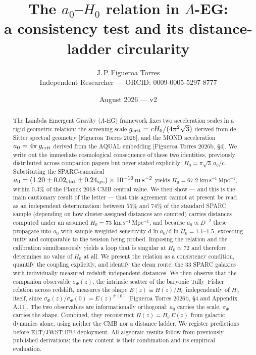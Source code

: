 \documentclass[11pt,a4paper]{article}
\title{The $a_0$--$H_0$ relation in $\Lambda$-EG:\\
a consistency test and its distance-ladder circularity}
\author{J.\,P.\,Figueroa Torres\\
\small Independent Researcher --- ORCID: 0009-0005-5297-8777}
\date{August 2026 --- v2}
\begin{document}
\maketitle

\begin{abstract}
The Lambda Emergent Gravity ($\Lambda$-EG) framework fixes two acceleration
scales in a rigid geometric relation: the screening scale $g_{\rm crit} =
cH_0/(4\pi^2\sqrt{3})$ derived from de Sitter spectral geometry [Figueroa
Torres 2026], and the MOND acceleration $a_0 = 4\pi\, g_{\rm crit}$ derived from
the AQUAL embedding [Figueroa Torres 2026b, \S4]. We write out the immediate
cosmological consequence of these two identities, previously distributed
across companion papers but never stated explicitly: $H_0 = \pi\sqrt{3}\,
a_0/c$. Substituting the SPARC-canonical $a_0 = (1.20 \pm 0.02_{\rm stat}
\pm 0.24_{\rm sys})\times 10^{-10}\,\rm m\,s^{-2}$ yields $H_0 = 67.2$
km\,s$^{-1}$\,Mpc$^{-1}$, within $0.3\%$ of the Planck 2018 CMB central
value. We then show --- and this is the main cautionary result of the letter
--- that this agreement cannot at present be read as an independent
determination: between $55\%$ and $74\%$ of the standard SPARC sample
(depending on how cluster-assigned distances are counted) carries distances
computed under an assumed $H_0 = 73$ km\,s$^{-1}$\,Mpc$^{-1}$, and because
$a_0 \propto D^{-2}$ these propagate into $a_0$ with sample-weighted
sensitivity $\mathrm{d}\ln a_0/\mathrm{d}\ln H_0 = 1.1$--$1.5$, exceeding
unity and comparable to the tension being probed. Imposing the relation and
the calibration simultaneously yields a loop that is singular at
$H_0 \simeq 72$ and therefore determines no value of $H_0$ at all. We
present the relation as a consistency condition, quantify the coupling
explicitly, and identify the clean route: the $33$ SPARC galaxies with
individually measured redshift-independent distances.
We then observe that the companion
observable $\sigma_\Phi(z)$, the intrinsic scatter of the baryonic Tully--Fisher
relation across redshift, measures the shape $E(z) \equiv H(z)/H_0$
independently of $H_0$ itself, since $\sigma_\Phi(z)/\sigma_\Phi(0) =
E(z)^{\beta'(0)}$ [Figueroa Torres 2026b, \S4 and Appendix A.11]. The two
observables are informationally orthogonal: $a_0$ carries the scale, $\sigma_\Phi$
carries the shape. Combined, they reconstruct $H(z) = H_0\, E(z)$ from galactic
dynamics alone, using neither the CMB nor a distance ladder. We register
predictions before ELT/JWST-IFU deployment. All algebraic results follow from
previously published derivations; the new content is their combination and
its empirical evaluation.
\end{abstract}
\end{document}

